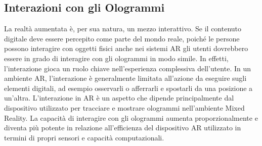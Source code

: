 \subsection{Interazioni con gli Ologrammi}
La realtà aumentata è, per sua natura, un mezzo interattivo. Se il contenuto digitale deve essere percepito come parte del mondo reale, poiché le persone possono interagire con oggetti fisici anche nei sistemi AR gli utenti dovrebbero essere in grado di interagire con gli ologrammi in modo simile. In effetti, l'interazione gioca un ruolo chiave nell'esperienza complessiva dell'utente. In un ambiente AR, l'interazione è generalmente limitata all'azione da eseguire sugli elementi digitali, ad esempio osservarli o afferrarli e spostarli da una posizione a un'altra. L'interazione in AR è un aspetto che dipende principalmente dal dispositivo utilizzato per tracciare e mostrare ologrammi nell'ambiente Mixed Reality. La capacità di interagire con gli ologrammi aumenta proporzionalmente e diventa più potente in relazione all'efficienza del dispositivo AR utilizzato in termini di propri sensori e capacità computazionali. 

